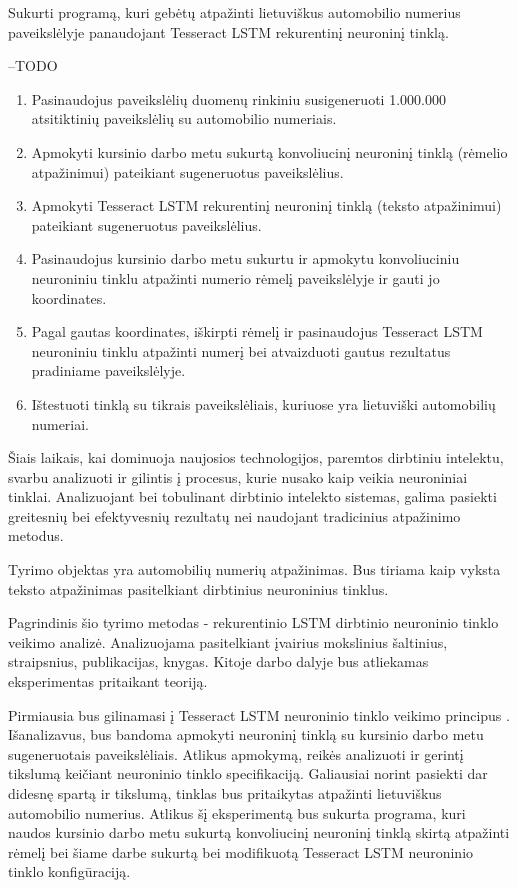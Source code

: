 \documentclass{VUMIFInfBakalaurinis}
\begin{document}
Sukurti programą, kuri gebėtų atpažinti lietuviškus automobilio numerius paveikslėlyje panaudojant Tesseract LSTM rekurentinį neuroninį tinklą.

--TODO
\begin{enumerate}
  \item Pasinaudojus paveikslėlių duomenų rinkiniu susigeneruoti 1.000.000 atsitiktinių paveikslėlių su automobilio numeriais.
  \item Apmokyti kursinio darbo metu sukurtą konvoliucinį neuroninį tinklą (rėmelio atpažinimui) pateikiant sugeneruotus paveikslėlius.
  \item Apmokyti Tesseract LSTM rekurentinį neuroninį tinklą (teksto atpažinimui) pateikiant sugeneruotus paveikslėlius.
  \item Pasinaudojus kursinio darbo metu sukurtu ir apmokytu konvoliuciniu neuroniniu tinklu atpažinti numerio rėmelį paveikslėlyje ir gauti jo koordinates.
  \item Pagal gautas koordinates, iškirpti rėmelį ir pasinaudojus Tesseract LSTM neuroniniu tinklu atpažinti numerį bei atvaizduoti gautus rezultatus pradiniame paveikslėlyje.
  \item Ištestuoti tinklą su tikrais paveikslėliais, kuriuose yra lietuviški automobilių numeriai.
\end{enumerate}

Šiais laikais, kai dominuoja naujosios technologijos, paremtos dirbtiniu intelektu, svarbu
analizuoti ir gilintis į procesus, kurie nusako kaip veikia neuroniniai tinklai. Analizuojant bei 
tobulinant dirbtinio intelekto sistemas, galima pasiekti greitesnių bei efektyvesnių rezultatų nei
naudojant tradicinius atpažinimo metodus.

Tyrimo objektas yra automobilių numerių atpažinimas. Bus tiriama kaip vyksta teksto atpažinimas pasitelkiant dirbtinius neuroninius tinklus.

Pagrindinis šio tyrimo metodas - rekurentinio LSTM dirbtinio neuroninio tinklo veikimo
analizė. Analizuojama pasitelkiant įvairius mokslinius šaltinius, straipsnius, publikacijas, knygas.
Kitoje darbo dalyje bus atliekamas eksperimentas pritaikant teoriją.

Pirmiausia bus gilinamasi į Tesseract LSTM neuroninio tinklo veikimo principus \cite{bhushan2013license}.
Išanalizavus, bus bandoma apmokyti neuroninį tinklą su kursinio darbo metu sugeneruotais 
paveikslėliais. Atlikus apmokymą, reikės analizuoti ir gerintį tikslumą keičiant neuroninio tinklo
specifikaciją. Galiausiai norint pasiekti dar didesnę spartą ir tikslumą, tinklas bus pritaikytas 
atpažinti lietuviškus automobilio numerius. Atlikus šį eksperimentą bus sukurta programa, kuri
naudos kursinio darbo metu sukurtą konvoliucinį neuroninį tinklą skirtą atpažinti rėmelį bei šiame
darbe sukurtą bei modifikuotą Tesseract LSTM neuroninio tinklo konfigūraciją.
\end{document}
